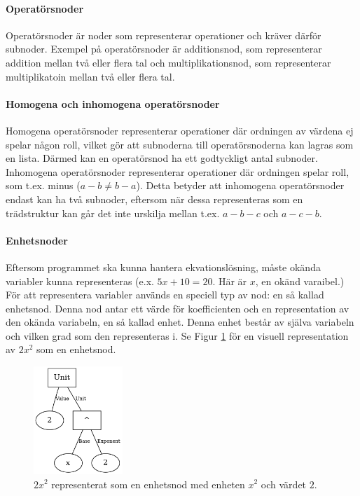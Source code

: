 \documentclass[12pt,a4paper]{article}
\begin{document}
\paragraph{Operatörsnoder}
Operatörsnoder är noder som representerar operationer och kräver därför subnoder. Exempel på operatörsnoder är additionsnod, som representerar addition mellan två eller flera tal och multiplikationsnod, som representerar multiplikatoin mellan två eller flera tal.
\paragraph{Homogena och inhomogena operatörsnoder}
\label{subsec:operator}
Homogena operatörsnoder representerar operationer där ordningen av värdena ej spelar någon roll, vilket gör att subnoderna till operatörsnoderna kan lagras som en lista. Därmed kan en operatörsnod ha ett godtyckligt antal subnoder. Inhomogena operatörsnoder representerar operationer där ordningen spelar roll, som t.ex. minus (\(a - b \neq b - a\)). Detta betyder att inhomogena operatörsnoder endast kan ha två subnoder, eftersom när dessa representeras som en trädstruktur kan går det inte urskilja mellan t.ex. \(a - b - c\) och \(a - c - b\).
\paragraph{Enhetsnoder}
Eftersom programmet ska kunna hantera ekvationslösning, måste okända variabler kunna representeras (e.x. \(5x + 10 = 20\). Här är \(x\), en okänd varaibel.) För att representera variabler används en speciell typ av nod: en så kallad enhetsnod. Denna nod antar ett värde för koefficienten och en representation av den okända variabeln, en så kallad enhet. Denna enhet består av själva variabeln och vilken grad som den representeras i. Se Figur \ref{fig:2132} för en visuell representation av \(2x^{2}\) som en enhetsnod.
\begin{figure}[H]
  \centering
  \includegraphics[width=0.3\textwidth]{image25}
  \caption{\(2x^{2}\) representerat som en enhetsnod med enheten \(x^{2}\) och värdet \(2\).}
  \label{fig:2132}
\end{figure}
\end{document}
